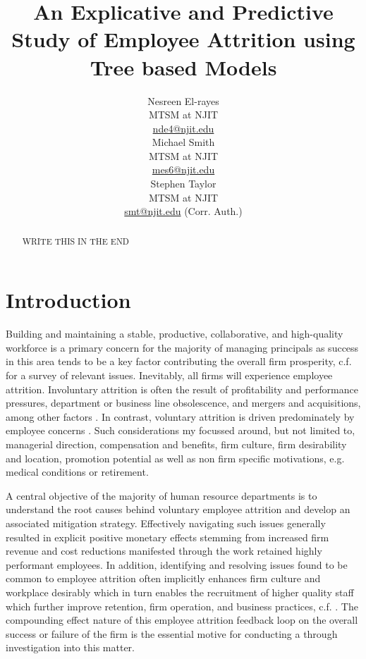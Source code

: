 \documentclass[10pt]{article}
\title{An Explicative and Predictive Study of Employee Attrition using Tree based Models}
\author{Nesreen El-rayes\\
  MTSM at NJIT \\
  {\underline{nde4@njit.edu}} \\\And
  Michael Smith\\
  MTSM at NJIT \\
  {\underline{mes6@njit.edu}}\\\And 
  Stephen Taylor\\
  MTSM at NJIT \\
  {\underline{smt@njit.edu} (Corr. Auth.)} \\}
\date{}
\begin{document}
\maketitle
\begin{abstract}
WRITE THIS IN THE END
\end{abstract}

\section{Introduction}
Building and maintaining a stable, productive, collaborative, and high-quality workforce is a primary concern 
for the majority of managing principals as success in this area tends to be a key factor contributing the 
overall firm prosperity, c.f. \cite{Mir1993} for a survey of relevant issues.
Inevitably, all firms will experience employee attrition.  
Involuntary attrition is often the result of profitability and performance pressures, department or business 
line obsolescence, and mergers and acquisitions, among other factors \cite{Datta2009,Grip2006,SHAU1998}.  In contrast,
voluntary attrition is driven predominately by employee concerns \cite{Singh2012}.  Such considerations 
my focussed around, but not limited to, managerial direction, compensation and benefits, firm culture, 
firm desirability and location, promotion potential as well as non firm specific motivations, e.g. medical 
conditions or retirement. 
  
A central objective of the majority of human resource departments is to understand the root causes 
behind voluntary employee attrition and develop an associated mitigation strategy.  Effectively 
navigating such issues generally resulted in explicit positive monetary effects stemming from increased 
firm revenue and cost reductions manifested through the work retained highly performant employees. 
In addition, identifying and resolving issues found to be common to employee attrition often implicitly 
enhances firm culture and workplace desirably which in turn enables the recruitment of higher quality 
staff which further improve retention, firm operation, and business practices, c.f.  \cite{Cook1986,Free1994}.  
The compounding effect nature of 
this employee attrition feedback loop on the overall success or failure of the firm is the essential motive 
for conducting a through investigation into this matter. 
\end{document}
